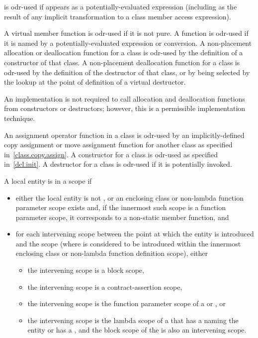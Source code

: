 \pnum
{} is odr-used if  appears as a potentially-evaluated expression
(including as the result of any implicit transformation to
a class member access expression).

\pnum
A virtual member
function is odr-used if it is not pure.
A function is odr-used if it is named by
a potentially-evaluated expression or conversion.
A non-placement allocation or deallocation
function for a class is odr-used by the definition of a constructor of that
class. A non-placement deallocation function for a class is odr-used by the
definition of the destructor of that class, or by being selected by the
lookup at the point of definition of a virtual
destructor.
\begin{footnote}
An implementation is not required
to call allocation and
deallocation functions from constructors or destructors; however, this
is a permissible implementation technique.
\end{footnote}

\pnum
An assignment operator function in a class is odr-used by an
implicitly-defined
copy assignment or move assignment function for another class as specified
in~\ref{class.copy.assign}.
A constructor for a class is odr-used as specified
in~\ref{dcl.init}. A destructor for a class is odr-used if it is potentially
invoked.

\pnum
A local entity
is  in a scope if
\begin{itemize}
\item either the local entity is not , or
an enclosing class or non-lambda function parameter scope exists and,
if the innermost such scope is a function parameter scope,
it corresponds to a non-static member function, and
\item
for each intervening scope
between the point at which the entity is introduced and the scope
(where  is considered to be introduced
within the innermost enclosing class or non-lambda function definition scope),
either
\begin{itemize}
\item the intervening scope is a block scope,
\item the intervening scope is a contract-assertion scope,
\item the intervening scope is the function parameter scope of
a  or , or
\item the intervening scope is the lambda scope of
a 
that has a 
naming the entity or has a , and
the block scope of the 
is also an intervening scope.
\end{itemize}
\end{itemize}

